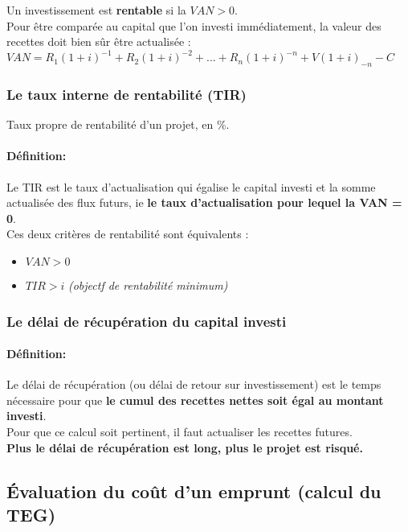 \documentclass{article}
\begin{document}
Un investissement est \textbf{rentable} si la $VAN > 0$.\\

Pour \^etre comparée au capital que l'on investi immédiatement, la valeur des recettes doit bien s\^ur \^etre actualisée :\\
$VAN = R_{1}(1+i)^{-1} + R_{2}(1+i)^{-2} + ... + R_{n}(1+i)^{-n} + V(1+i)_{-n} - C$\\

\subsubsection{Le taux interne de rentabilité (TIR)}
Taux propre de rentabilité d'un projet, en \%.\\
\paragraph{Définition:} Le TIR est le taux d'actualisation qui égalise le capital investi et la somme actualisée des flux futurs, ie \textbf{le taux d'actualisation pour lequel la VAN = 0}.\\

Ces deux critères de rentabilité sont équivalents :
\begin{itemize}
	\item $VAN > 0$
	\item $TIR > i$ \textit{(objectf de rentabilité minimum)}
\end{itemize}

\subsubsection{Le délai de récupération du capital investi}
\paragraph{Définition:} Le délai de récupération (ou délai de retour sur investissement) est le temps nécessaire pour que \textbf{le cumul des recettes nettes soit égal au montant investi}.\\

Pour que ce calcul soit pertinent, il faut actualiser les recettes futures.\\

\textbf{Plus le délai de récupération est long, plus le projet est risqué.}

\subsection{\'Evaluation du co\^ut d'un emprunt (calcul du TEG)}
\end{document}
